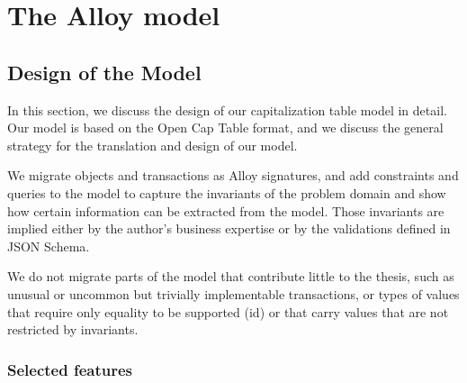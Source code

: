 \chapter{The Alloy model}

\section{Design of the Model}

In this section, we discuss the design of our capitalization table model in detail. Our model is based on the Open Cap Table format, and we discuss the general strategy for the translation and design of our model. 

We migrate objects and transactions as Alloy signatures, and add constraints and queries to the model to capture the invariants of the problem domain and show how certain information can be extracted from the model. Those invariants are implied either by the author's business expertise or by the validations defined in JSON Schema. 

We do not migrate parts of the model that contribute little to the thesis, such as unusual or uncommon but trivially implementable transactions, or types of values that require only equality to be supported (id) or that carry values that are not restricted by invariants.

\subsection{Selected features}

